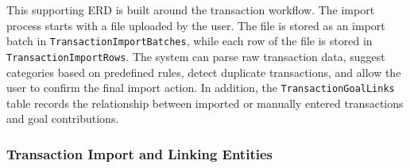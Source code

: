 \documentclass{article}
\begin{document}
This supporting ERD is built around the transaction workflow. The import process starts with a
file uploaded by the user. The file is stored as an import batch in
\texttt{TransactionImportBatches}, while each row of the file is stored in
\texttt{TransactionImportRows}. The system can parse raw transaction data, suggest categories
based on predefined rules, detect duplicate transactions, and allow the user to confirm the
final import action. In addition, the \texttt{TransactionGoalLinks} table records the
relationship between imported or manually entered transactions and goal contributions.

\subsubsection{Transaction Import and Linking Entities}
\end{document}
